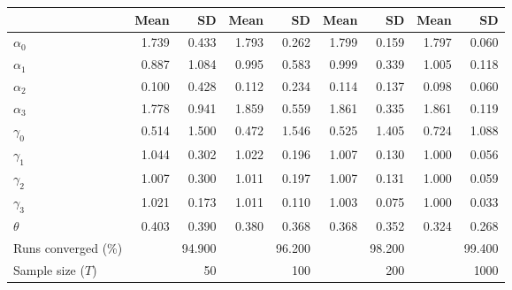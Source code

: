 
\begin{tabular}[t]{lrrrrrrrr}
\toprule
  & Mean & SD & Mean  & SD  & Mean   & SD   & Mean    & SD   \\
\midrule
$\alpha_{0}$ & 1.739 & 0.433 & 1.793 & 0.262 & 1.799 & 0.159 & 1.797 & 0.060\\
$\alpha_{1}$ & 0.887 & 1.084 & 0.995 & 0.583 & 0.999 & 0.339 & 1.005 & 0.118\\
$\alpha_{2}$ & 0.100 & 0.428 & 0.112 & 0.234 & 0.114 & 0.137 & 0.098 & 0.060\\
$\alpha_{3}$ & 1.778 & 0.941 & 1.859 & 0.559 & 1.861 & 0.335 & 1.861 & 0.119\\
$\gamma_{0}$ & 0.514 & 1.500 & 0.472 & 1.546 & 0.525 & 1.405 & 0.724 & 1.088\\
$\gamma_{1}$ & 1.044 & 0.302 & 1.022 & 0.196 & 1.007 & 0.130 & 1.000 & 0.056\\
$\gamma_{2}$ & 1.007 & 0.300 & 1.011 & 0.197 & 1.007 & 0.131 & 1.000 & 0.059\\
$\gamma_{3}$ & 1.021 & 0.173 & 1.011 & 0.110 & 1.003 & 0.075 & 1.000 & 0.033\\
$\theta$ & 0.403 & 0.390 & 0.380 & 0.368 & 0.368 & 0.352 & 0.324 & 0.268\\
Runs converged (\%) &  & 94.900 &  & 96.200 &  & 98.200 &  & 99.400\\
Sample size ($T$) &  & 50 &  & 100 &  & 200 &  & 1000\\
\bottomrule
\end{tabular}
